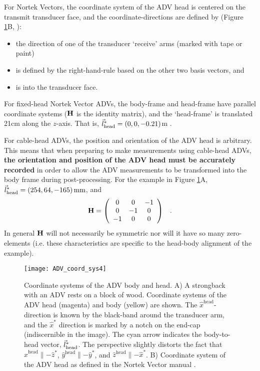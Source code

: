For Nortek Vectors, the coordinate system of the ADV head is centered on the transmit transducer face, and the coordinate-directions are defined by (Figure \ref{fig:adv-coord-sys}B, \cite{vector_manual2005}):
\begin{itemize}
\item[$\hat{x}^\mathrm{head}$:] the direction of one of the transducer `receive' arms (marked with tape or paint)
\item[$\hat{y}^\mathrm{head}$:] is defined by the right-hand-rule based on the other two basis vectors, and
\item[$\hat{z}^\mathrm{head}$:] is into the transducer face.
\end{itemize}

For fixed-head Nortek Vector ADVs, the body-frame and head-frame have parallel coordinate systems ($\mathbf{H}$ is the identity matrix), and the `head-frame' is translated 21cm along the $z$-axis.  That is, $\vec{l}_\mathrm{head}^* = (0, 0, -0.21)$m \cite[]{vector_manual2005}.  

For cable-head ADVs, the position and orientation of the ADV head is arbitrary.  This means that when preparing to make measurements using cable-head ADVs, {\bf the orientation and position of the ADV head must be accurately recorded} in order to allow the ADV measurements to be transformed into the body frame during post-processing. For the example in Figure \ref{fig:adv-coord-sys}A, $\vec{l}_\mathrm{head}^* = (254,64,-165)\,\mathrm{mm}$, and
\begin{align*}
  \mathbf{H} &= \left (
    \begin{array}{ccc}
      0 & 0 & -1 \\
      0 & -1 & 0 \\
      -1 & 0 & 0
    \end{array}
    \right ) & .
\end{align*}
In general $\mathbf{H}$ will not necessarily be symmetric nor will it have so many zero-elements (i.e. these characteristics are specific to the head-body alignment of the example).


\begin{figure*}
  \centering
    \texttt{[image: ADV\_coord\_sys4]}
  \caption{Coordinate systems of the ADV body and head. A) A strongback with an ADV rests on a block of wood. Coordinate systems of the ADV head (magenta) and body (yellow) are shown. The $\hat{x}^\mathrm{head}$-direction is known by the black-band around the transducer arm, and the $\hat{x}^*$ direction is marked by a notch on the end-cap (indiscernible in the image). The cyan arrow indicates the body-to-head vector, $\vec{l}_\mathrm{head}^*$.  The perspective slightly distorts the fact that  $\hat{x}^\mathrm{head} \parallel -\hat{z}^* $, $\hat{y}^\mathrm{head} \parallel -\hat{y}^* $, and $\hat{z}^\mathrm{head} \parallel -\hat{x}^* $.  B) Coordinate system of the ADV head as defined in the Nortek Vector manual \cite[]{vector_manual2005}. }
  \label{fig:adv-coord-sys}
\end{figure*}

